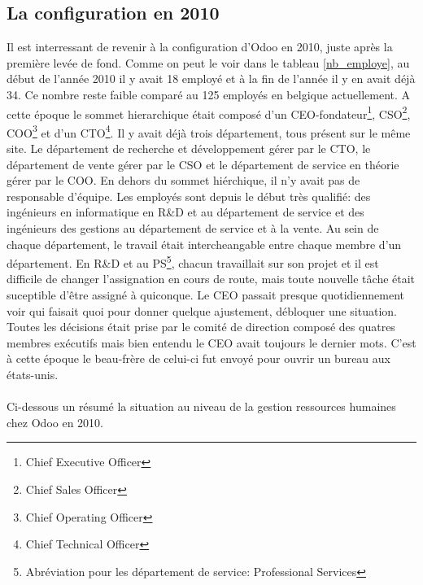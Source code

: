 \subsection{La configuration en 2010}
Il est interressant de revenir à la configuration d'Odoo en 2010, juste après la première levée de fond. Comme on peut le voir dans le tableau \ref{nb_employe}, au début de l'année 2010 il y avait 18 employé et à la fin de l'année il y en avait déjà 34. Ce nombre reste faible comparé au 125 employés en belgique actuellement. A cette époque le sommet hierarchique était composé d'un CEO-fondateur\footnote{Chief Executive Officer}, CSO\footnote{Chief Sales Officer}, COO\footnote{Chief Operating Officer} et d'un CTO\footnote{Chief Technical Officer}. Il y avait déjà trois département, tous présent sur le même site. Le département de recherche et développement gérer par le CTO, le département de vente gérer par le CSO et le département de service en théorie gérer par le COO. En dehors du sommet hiérchique, il n'y avait pas de responsable d'équipe. Les employés sont depuis le début très qualifié: des ingénieurs en informatique en R\&D et au département de service et des ingénieurs des gestions au département de service et à la vente. Au sein de chaque département, le travail était intercheangable entre chaque membre d'un département. En R\&D et au PS\footnote{Abréviation pour les département de service: Professional Services}, chacun travaillait sur son projet et il est difficile de changer l'assignation en cours de route, mais toute nouvelle tâche était suceptible d'être assigné à quiconque. Le CEO passait presque quotidiennement voir qui faisait quoi pour donner quelque ajustement, débloquer une situation. Toutes les décisions était prise par le comité de direction composé des quatres membres exécutifs mais bien entendu le CEO avait toujours le dernier mots. C'est à cette époque le beau-frère de celui-ci fut envoyé pour ouvrir un bureau aux états-unis.  

\newpage
\paragraph{}Ci-dessous un résumé la situation au niveau de la gestion ressources humaines chez Odoo en 2010.

